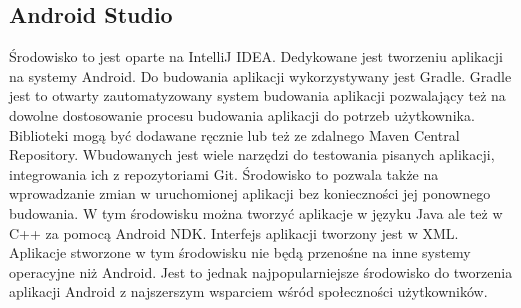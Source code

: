 \documentclass[archivemod, eng]{mgr}
\begin{document}
			\subsection{Android Studio}
			Środowisko to jest oparte na IntelliJ IDEA. Dedykowane jest tworzeniu aplikacji na systemy Android. Do budowania aplikacji wykorzystywany jest Gradle. Gradle jest to otwarty zautomatyzowany system budowania aplikacji pozwalający też na dowolne dostosowanie procesu budowania aplikacji do potrzeb użytkownika. Biblioteki mogą być dodawane ręcznie lub też ze zdalnego Maven Central Repository. Wbudowanych jest wiele narzędzi do testowania pisanych aplikacji, integrowania ich z repozytoriami Git. Środowisko to pozwala także na wprowadzanie zmian w uruchomionej aplikacji bez konieczności jej ponownego budowania. W tym środowisku można tworzyć aplikacje w języku Java ale też w C++ za pomocą Android NDK. Interfejs aplikacji tworzony jest w XML. Aplikacje stworzone w tym środowisku nie będą przenośne na inne systemy operacyjne niż Android. Jest to jednak najpopularniejsze środowisko do tworzenia aplikacji Android z najszerszym wsparciem wśród społeczności użytkowników.
			
\end{document}
